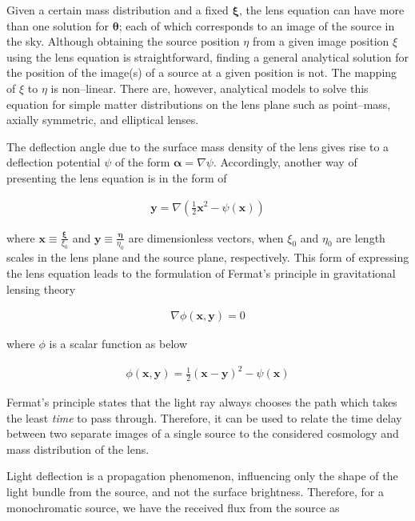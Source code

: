 \documentclass[a4wide,12pt]{book}
\begin{document}
{Given a certain mass distribution and a fixed $\boldsymbol \xi$, the lens equation can have more than one solution for $\boldsymbol \theta$; each of which corresponds to an image of the source in the sky.  Although obtaining the source position $\eta$ from a given image position $\xi$ using the lens equation is straightforward, finding a general analytical solution for the position of the image(s) of a source at a given position is not. The mapping of $\xi$ to $\eta$ is non--linear. There are, however, analytical models to solve this equation for simple matter distributions on the lens plane such as point--mass, axially symmetric, and elliptical lenses.

The deflection angle due to the surface mass density of the lens gives rise to a deflection potential $\psi$ of the form $\boldsymbol \alpha = \nabla \psi$. Accordingly, another way of presenting the lens equation is in the form of 

\begin{eqnarray}
\label{eq:potential_dimensionless_lensing}
\textbf{y} = \nabla \left(\frac{1}{2}\textbf{x}^2 - \psi(\textbf{x}) \right)
\end{eqnarray}

where $\textbf{x} \equiv \frac{\boldsymbol \xi}{\xi_0}$ and $\textbf{y} \equiv \frac{\boldsymbol \eta}{\eta_0}$ are dimensionless vectors, when $\xi_0$ and $\eta_0$ are length scales in the lens plane and the source plane, respectively. This form of expressing the lens equation leads to the formulation of Fermat's principle in gravitational lensing theory

\begin{eqnarray}
\nabla \phi(\textbf{x}, \textbf{y}) = 0
\end{eqnarray}

where $\phi$ is a scalar function as below

\begin{eqnarray}
\phi(\textbf{x}, \textbf{y}) = \frac{1}{2} (\textbf{x} - \textbf{y})^2 - \psi(\textbf{x})
\end{eqnarray}

Fermat's principle states that the light ray always chooses the path which takes the least \emph{time} to pass through. Therefore, it can be used to relate the time delay between two separate images of a single source to the considered cosmology and mass distribution of the lens.

Light deflection is a propagation phenomenon, influencing only the shape of the light bundle from the source, and not the surface brightness. Therefore, for a monochromatic source, we have the received flux from the source as 

}
\end{document}
